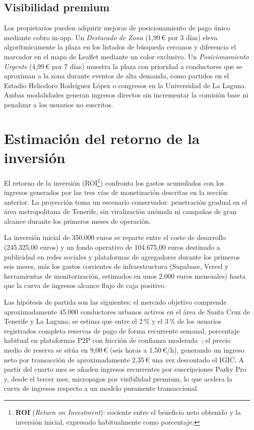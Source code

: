 \subsection{Visibilidad premium}
\label{subsec:visibilidad_premium}

Los propietarios pueden adquirir mejoras de posicionamiento de pago único mediante cobro in-app. Un \textit{Destacado de Zona} (1,99\,€ por 3 días) eleva algorítmicamente la plaza en los listados de búsqueda cercanos y diferencia el marcador en el mapa de Leaflet mediante un color exclusivo. Un \textit{Posicionamiento Urgente} (4,99\,€ por 7 días) muestra la plaza con prioridad a conductores que se aproximan a la zona durante eventos de alta demanda, como partidos en el Estadio Heliodoro Rodríguez López o congresos en la Universidad de La Laguna. Ambas modalidades generan ingresos directos sin incrementar la comisión base ni penalizar a los usuarios no suscritos.

\section{Estimación del retorno de la inversión}
\label{sec:estimacion_roi}

El retorno de la inversión (ROI\footnote{\textbf{ROI} (\textit{Return on Investment}): cociente entre el beneficio neto obtenido y la inversión inicial, expresado habitualmente como porcentaje.}) confronta los gastos acumulados con los ingresos generados por las tres vías de monetización descritas en la sección anterior. La proyección toma un escenario conservador: penetración gradual en el área metropolitana de Tenerife, sin viralización anómala ni campañas de gran alcance durante los primeros meses de operación.

La inversión inicial de 350.000 euros se reparte entre el coste de desarrollo (245.325,00 euros) y un fondo operativo de 104.675,00 euros destinado a publicidad en redes sociales y plataformas de agregadores durante los primeros seis meses, más los gastos corrientes de infraestructura (Supabase, Vercel y herramientas de monitorización, estimados en unos 2.000 euros mensuales) hasta que la curva de ingresos alcance flujo de caja positivo.

Las hipótesis de partida son las siguientes: el mercado objetivo comprende aproximadamente 45.000 conductores urbanos activos en el área de Santa Cruz de Tenerife y La Laguna; se estima que entre el 2\,\% y el 3\,\% de los usuarios registrados completa reservas de pago de forma recurrente semanal, porcentaje habitual en plataformas P2P con fricción de confianza moderada~\cite{grandviewresearch2022}; el precio medio de reserva se sitúa en 9,00\,€ (seis horas a 1,50\,€/h), generando un ingreso neto por transacción de aproximadamente 2,35\,€ una vez descontado el IGIC. A partir del cuarto mes se añaden ingresos recurrentes por suscripciones Parky Pro y, desde el tercer mes, micropagos por visibilidad premium, lo que acelera la curva de ingresos respecto a un modelo puramente transaccional.

